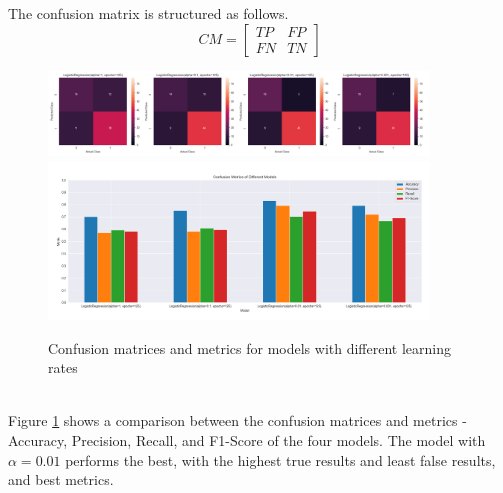 \documentclass[12pt]{article}
\begin{document}
    The confusion matrix is structured as follows.
    \begin{equation}
        CM = \begin{bmatrix}
            TP & FP \\
            FN & TN
        \end{bmatrix}
    \end{equation}
    \begin{figure}[h]
        \centering
        \includegraphics[width=0.9\textwidth]{./../Assets/confusion_matrices.png}
        \includegraphics[width=0.9\textwidth]{./../Assets/confusion_metrics.png}
        \caption{Confusion matrices and metrics for models with different learning rates}
        \label{fig:confusion}
    \end{figure}
    \vspace*{0pt} \\
    Figure \ref{fig:confusion} shows a comparison between the confusion matrices and metrics - Accuracy, Precision, Recall, and
    F1-Score of the four models. The model with $\alpha = 0.01$ performs the best, with the highest
    true results and least false results, and best metrics.
\end{document}
